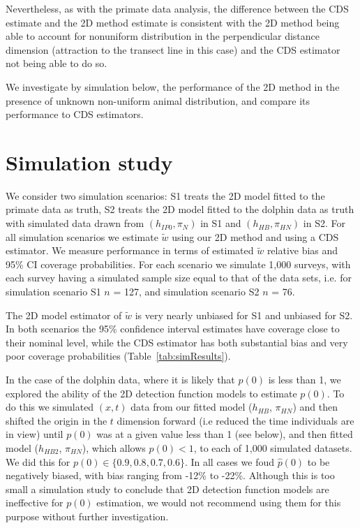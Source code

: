 \documentclass[useAMS,usenatbib,referee]{biom}
\begin{document}

Nevertheless, as with the primate data analysis, the difference between the CDS estimate and the 2D method estimate is consistent with the 2D method being able to account for nonuniform distribution in the perpendicular distance dimension (attraction to the transect line in this case) and the CDS estimator not being able to do so.

We investigate by simulation below, the performance of the 2D method in the presence of unknown non-uniform animal distribution, and compare its performance to CDS estimators.


\section{Simulation study}

We consider two simulation scenarios: S1 treats the 2D model fitted to the primate data as truth, S2 treats the 2D model fitted to the dolphin data as truth with simulated data drawn from  $(h_{IP0},\pi_{N})$ in S1 and $(h_{HB},\pi_{HN})$ in S2. For all simulation scenarios we estimate $\tilde{w}$ using our 2D method and using a CDS estimator. We measure performance in terms of estimated $\tilde{w}$ relative bias and 95\% CI coverage probabilities. For each scenario we simulate 1,000 surveys, with each survey having a simulated sample size equal to that of the data sets, i.e. for simulation scenario S1 $n$ = 127, and simulation scenario S2 $n$ = 76. 

The 2D model estimator of $\tilde{w}$ is very nearly unbiased for S1 and unbiased for S2.  In both scenarios the 95\% confidence interval estimates have coverage close to their nominal level, while the CDS estimator has both substantial bias and very poor coverage probabilities (Table~\ref{tab:simResults}). 

In the case of the dolphin data, where it is likely that $p(0)$ is less than 1, we explored the ability of the 2D detection function models to estimate $p(0)$. To do this we simulated $(x,t)$ data from our fitted model ($h_{HB}$, $\pi_{HN}$) and then shifted the origin in the $t$ dimension forward (i.e reduced the time individuals are in view) until $p(0)$ was at a given value less than 1 (see below), and then fitted model ($h_{HB2}$, $\pi_{HN}$), which allows $p(0)<1$, to each of 1,000 simulated datasets. We did this for $p(0)\in\{0.9,0.8,0.7,0.6\}$. In all cases we foud $\hat{p}(0)$ to be negatively biased, with bias ranging from -12\% to -22\%. Although this is too small a simulation study to conclude that 2D detection function models are ineffective for $p(0)$ estimation, we would not recommend using them for this purpose without further investigation.
\end{document}
